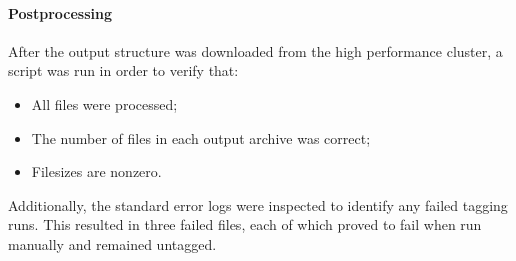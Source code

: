 \paragraph{Postprocessing}
After the output structure was downloaded from the high performance cluster, a script was run in order to verify that:

\begin{itemize}
    \item All files were processed;
    \item The number of files in each output archive was correct;
    \item Filesizes are nonzero.
\end{itemize}

Additionally, the standard error logs were inspected to identify any failed tagging runs.  This resulted in three failed files, each of which proved to fail when run manually and remained untagged.

